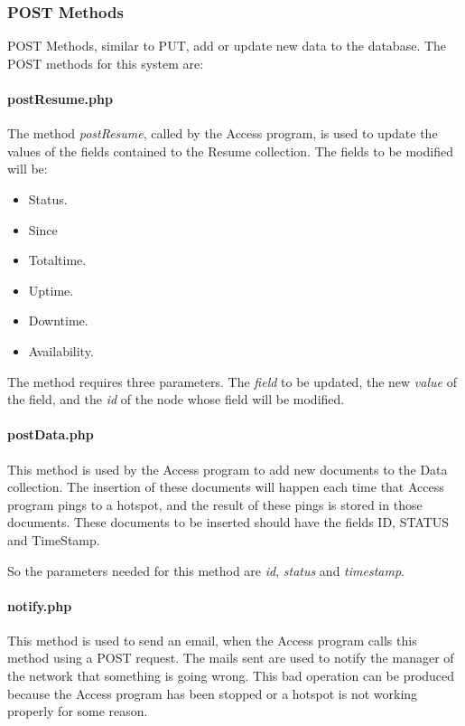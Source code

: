 \documentclass[12pt, a4paper,twoside]{tesi_upf}
\begin{document}
            \subsubsection{POST Methods}
            POST Methods, similar to PUT, add or update new data to the database. The POST methods for this system are:
            
                \paragraph{postResume.php}
                
                The method \textit{postResume}, called by the Access program, is used to update the values of the fields contained to the Resume collection. The fields to be modified will be: 
                \begin{itemize}
                \item Status.
                \item Since
                \item Totaltime.
                \item Uptime.
                \item Downtime.
                \item Availability.
                \end{itemize}
                
                The method requires three parameters. The \textit{field} to be updated, the new \textit{value} of the field, and the \textit{id} of the node whose field will be modified.\\
                
                
                \paragraph{postData.php}
                This method is used by the Access program to add new documents to the Data collection. The insertion of these documents will happen each time that Access program pings to a hotspot, and the result of these pings is stored in those documents. These documents to be inserted should have the fields ID, STATUS and TimeStamp. 
                
                So the parameters needed for this method are \textit{id}, \textit{status} and \textit{timestamp}.\\
                
                \paragraph{notify.php}
                This method is used to send an email, when the Access program calls this method using a POST request. The mails sent are used to notify the manager of the network that something is going wrong. This bad operation can be produced because the Access program has been stopped or a hotspot is not working properly for some reason.
                
\end{document}
